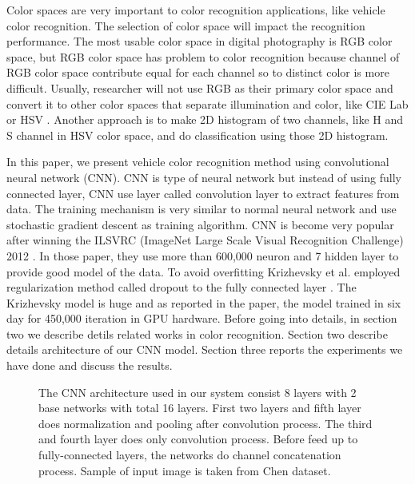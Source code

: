 \documentclass[conference]{IEEEtran}
\begin{document}
Color spaces are very important to color recognition applications, like vehicle color recognition. The selection of color space will impact the recognition performance. The most usable color space in digital photography is RGB color space, but RGB color space has problem to color recognition because channel of RGB color space contribute equal for each channel so to distinct color is more difficult. Usually, researcher will not use RGB as their primary color space and convert it to other color spaces that separate illumination and color, like CIE Lab or HSV \cite{baek,dule,jwson}. Another approach is to make 2D histogram of two channels, like H and S channel in HSV color space, and do classification using those 2D histogram.

In this paper, we present vehicle color recognition method using convolutional neural network (CNN). CNN is type of neural network but instead of using fully connected layer, CNN use layer called convolution layer to extract features from data. The training mechanism is very similar to normal neural network and use stochastic gradient descent as training algorithm. CNN is become very popular after winning the ILSVRC (ImageNet Large Scale Visual Recognition Challenge) 2012 \cite{alex}. In those paper, they use more than 600,000 neuron and 7 hidden layer to provide good model of the data. To avoid overfitting Krizhevsky et al. \cite{alex} employed regularization method called dropout to the fully connected layer \cite{srivastava}. The Krizhevsky model is huge and as reported in the paper, the model trained in six day for 450,000 iteration in GPU hardware. Before going into details, in section two we describe detils related works in color recognition. Section two describe details architecture of our CNN model. Section three reports the experiments we have done and discuss the results.


\begin{figure*}
\centering
\caption{The CNN architecture used in our system consist 8 layers with 2 base networks with total 16 layers. First two layers and fifth layer does normalization and pooling after convolution process. The third and fourth layer does only convolution process. Before feed up to fully-connected layers, the networks do channel concatenation process. Sample of input image is taken from Chen \cite{pchen} dataset.}
\label{fig:cnnarch}
\end{figure*}
\end{document}
